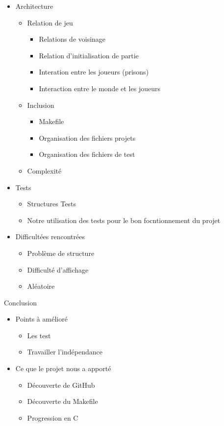 \documentclass[10pt,a4paper,oneside]{report}
\begin{document}
\begin{itemize}
    
    \item Architecture 
    \begin{itemize}
        \item Relation de jeu 
        \begin{itemize}
            \item Relations de voisinage 
            \item Relation d'initialisation de partie 
            \item Interation entre les joueurs (prisons)
            \item Interaction entre le monde et les joueurs 
        \end{itemize}
        \item Inclusion
        \begin{itemize}
            \item Makefile
            \item Organisation des fichiers projets
            \item Organisation des fichiers de test
        \end{itemize}
        \item Complexité 
    \end{itemize}
    \item Tests 
    \begin{itemize}
        \item Structures Tests
        \item Notre utilisation des tests pour le bon focntionnement du projet 
    \end{itemize}
    \item Difficultées rencontrées 
    \begin{itemize}
        \item Problème de structure
        \item Difficulté d'affichage  
        \item Aléatoire 
    \end{itemize}
    \end{itemize}

Conclusion
\begin{itemize}
    \item Points à amélioré
    \begin{itemize}
        \item Les test
        \item Travailler l'indépendance 
        
    \end{itemize}
    \item Ce que le projet nous a apporté 
    \begin{itemize}
        \item Découverte de GitHub
        \item Découverte du Makefile
        \item Progression en C
        
    \end{itemize}
\end{itemize}
\end{document}
